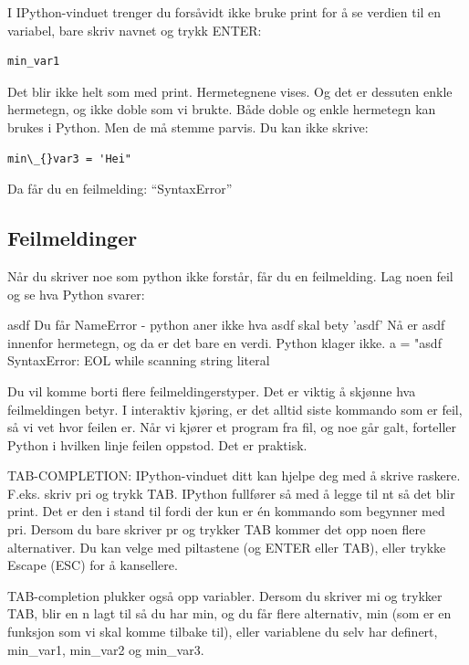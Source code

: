 I IPython-vinduet trenger du forsåvidt ikke bruke print for å se verdien til en variabel, bare skriv navnet og trykk ENTER:
\begin{lstlisting}
min_var1
\end{lstlisting}

Det blir ikke helt som med print. Hermetegnene vises. Og det er dessuten enkle hermetegn, og ikke doble som vi brukte. Både doble og enkle hermetegn kan brukes i Python. Men de må stemme parvis. Du kan ikke skrive:

\begin{lstlisting}
min\_{}var3 = 'Hei"
\end{lstlisting}

Da får du en feilmelding: ``SyntaxError''

\subsection{Feilmeldinger}

Når du skriver noe som python ikke forstår, får du en feilmelding.  Lag noen feil og se hva Python svarer:

\iffalse

asdf
Du får NameError - python aner ikke hva asdf skal bety 
'asdf'
Nå er asdf innenfor hermetegn, og da er det bare en verdi. Python klager ikke.
a = "asdf
SyntaxError: EOL while scanning string literal

Du vil komme borti flere feilmeldingerstyper. 
Det er viktig å skjønne hva feilmeldingen betyr.  
I interaktiv kjøring, er det alltid siste kommando som er feil, så vi vet hvor feilen er. 
Når vi kjører et program fra fil, og noe går galt, forteller Python i hvilken linje
feilen oppstod. Det er praktisk. 


TAB-COMPLETION: 
IPython-vinduet ditt kan hjelpe deg med å skrive raskere.
F.eks. skriv pri og trykk TAB. IPython fullfører så med å legge til nt så det blir print.
Det er den i stand til fordi der kun er én kommando som begynner med pri.
Dersom du bare skriver pr og trykker TAB kommer det opp noen flere alternativer.
Du kan velge med piltastene (og ENTER eller TAB), eller trykke Escape (ESC) for å kansellere.

TAB-completion plukker også opp variabler.
Dersom du skriver mi og trykker TAB, blir en n lagt til så du har min,
og du får flere alternativ, min (som er en funksjon som vi skal komme tilbake til),
eller variablene du selv har definert, min_var1, min_var2 og min_var3.






